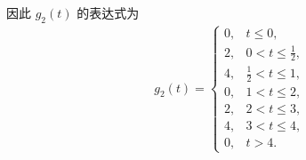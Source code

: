 \begin{solution}
\begin{enumerate}[label=(\arabic*)]
            因此 $g_2(t)$ 的表达式为
            \begin{align*}
                g_2(t) = \begin{cases}
                    0, & t \le 0, \\
                    2, & 0 < t \le \frac{1}{2}, \\
                    4, & \frac{1}{2} < t \le 1, \\
                    0, & 1 < t \le 2, \\
                    2, & 2 < t \le 3, \\
                    4, & 3 < t \le 4, \\
                    0, & t > 4.
                \end{cases}
            \end{align*}


\end{enumerate}
\end{solution}
